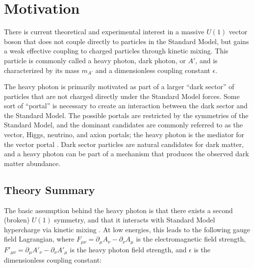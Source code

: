\chapter{Motivation}
There is current theoretical and experimental interest in a massive $U(1)$ vector boson that does not couple directly to particles in the Standard Model, but gains a weak effective coupling to charged particles through kinetic mixing.
This particle is commonly called a heavy photon, dark photon, or $A'$, and is characterized by its mass $m_{A'}$ and a dimensionless coupling constant $\epsilon$.

The heavy photon is primarily motivated as part of a larger ``dark sector'' of particles that are not charged directly under the Standard Model forces.
Some sort of ``portal'' is necessary to create an interaction between the dark sector and the Standard Model.
The possible portals are restricted by the symmetries of the Standard Model, and the dominant candidates are commonly referred to as the vector, Higgs, neutrino, and axion portals; the heavy photon is the mediator for the vector portal \cite{essig_dark_2013}.
Dark sector particles are natural candidates for dark matter, and a heavy photon can be part of a mechanism that produces the observed dark matter abundance.

%

\section{Theory Summary}
The basic assumption behind the heavy photon is that there exists a second (broken) $U(1)$ symmetry, and that it interacts with Standard Model hypercharge via kinetic mixing \cite{holdom_two_1986}.
At low energies, this leads to the following gauge field Lagrangian, where $F_{\mu\nu}=\partial_\mu A_\nu - \partial_\nu A_\mu$ is the electromagnetic field strength, $F'_{\mu\nu} = \partial_\mu A'_\nu - \partial_\nu A'_\mu$ is the heavy photon field strength, and $\epsilon$ is the dimensionless coupling constant:

